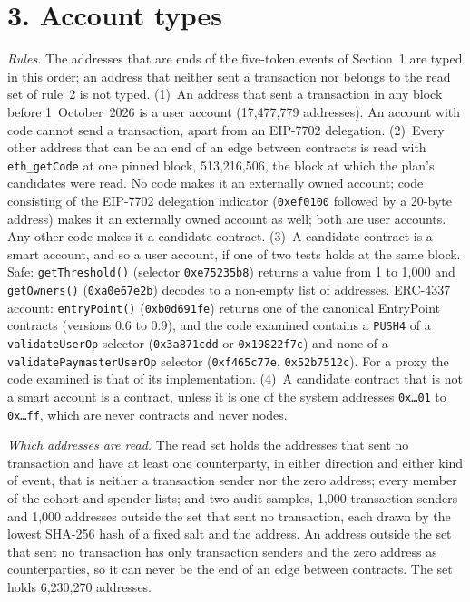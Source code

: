 \documentclass[10pt,letterpaper]{article}
\newcommand{\hash}[1]{\texttt{\small #1}}
\begin{document}
\section*{3. Account types}
\textit{Rules.} The addresses that are ends of the five-token events of Section~1 are typed in this order; an address that neither sent a transaction nor belongs to the read set of rule~2 is not typed.
(1)~An address that sent a transaction in any block before 1~October~2026 is a user account (17,477,779 addresses). An account with code cannot send a transaction, apart from an EIP-7702 delegation.
(2)~Every other address that can be an end of an edge between contracts is read with \texttt{eth\_getCode} at one pinned block, 513,216,506, the block at which the plan's candidates were read. No code makes it an externally owned account; code consisting of the EIP-7702 delegation indicator (\texttt{0xef0100} followed by a 20-byte address) makes it an externally owned account as well; both are user accounts. Any other code makes it a candidate contract.
(3)~A candidate contract is a smart account, and so a user account, if one of two tests holds at the same block. Safe: \texttt{getThreshold()} (selector \hash{0xe75235b8}) returns a value from 1 to 1,000 and \texttt{getOwners()} (\hash{0xa0e67e2b}) decodes to a non-empty list of addresses. ERC-4337 account: \texttt{entryPoint()} (\hash{0xb0d691fe}) returns one of the canonical EntryPoint contracts (versions 0.6 to 0.9), and the code examined contains a \texttt{PUSH4} of a \texttt{validateUserOp} selector (\hash{0x3a871cdd} or \hash{0x19822f7c}) and none of a \texttt{validatePaymasterUserOp} selector (\hash{0xf465c77e}, \hash{0x52b7512c}). For a proxy the code examined is that of its implementation.
(4)~A candidate contract that is not a smart account is a contract, unless it is one of the system addresses \texttt{0x\ldots{}01} to \texttt{0x\ldots{}ff}, which are never contracts and never nodes.

\textit{Which addresses are read.} The read set holds the addresses that sent no transaction and have at least one counterparty, in either direction and either kind of event, that is neither a transaction sender nor the zero address; every member of the cohort and spender lists; and two audit samples, 1,000 transaction senders and 1,000 addresses outside the set that sent no transaction, each drawn by the lowest SHA-256 hash of a fixed salt and the address. An address outside the set that sent no transaction has only transaction senders and the zero address as counterparties, so it can never be the end of an edge between contracts. The set holds 6,230,270 addresses.
\end{document}
